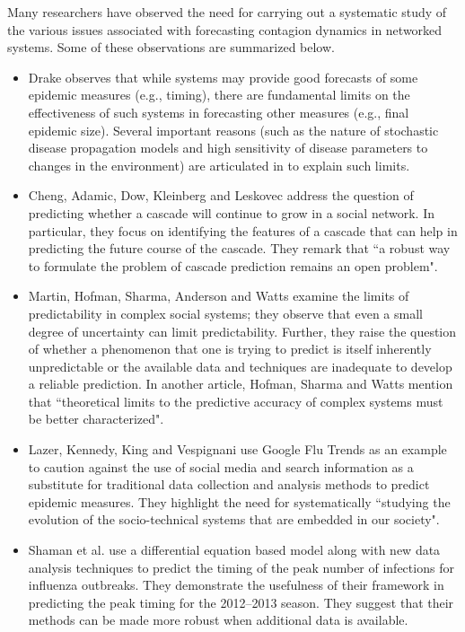 \medskip
Many researchers have observed the need for carrying out
a systematic study of the various issues associated with forecasting 
contagion dynamics in networked systems.
Some of these observations are summarized below.

\begin{itemize}
\item
Drake \cite{Drake-2005, Drake-2006} observes that
while systems may provide good forecasts 
of some epidemic  measures (e.g., timing),
there are fundamental limits on the effectiveness
of such systems in forecasting other measures (e.g., final epidemic size).
Several important reasons (such as the nature of stochastic 
disease propagation models and high sensitivity of disease parameters
to changes in the environment)
are articulated in \cite{Drake-2005,Drake-2006}
to explain such limits. 

\item
Cheng, Adamic, Dow, Kleinberg and Leskovec \cite{Cheng_etal_2016}
address the question of predicting whether a cascade will continue
to grow in a social network.  
In particular, they focus on identifying the features of a cascade
that can help in predicting the future course of the cascade.
They remark that ``a robust way to formulate the problem of cascade
prediction remains an open problem".

\item
Martin, Hofman, Sharma, Anderson and Watts \cite{Martin_etal_2016}
examine the limits of predictability
in complex social systems; they observe that even a small degree of
uncertainty can limit predictability.
Further, they raise the question of whether a phenomenon that
one is trying to predict is itself inherently unpredictable or 
the available data and techniques are inadequate to develop a
reliable prediction.
In another article, Hofman, Sharma and Watts \cite{Hofman-etal-2017}
mention that ``theoretical limits to the predictive accuracy of
complex systems must be better characterized".

\item 
Lazer, Kennedy, King and Vespignani \cite{lazer:science14} use 
Google Flu Trends as an example to caution against the use of social media 
and search information as a substitute for traditional data collection
and analysis methods to predict epidemic measures.
They highlight the need for systematically ``studying the evolution of the
socio-technical systems that are embedded in our society".

\item
Shaman et al. \cite{Shaman-etal-2012,Shaman-etal-2013}
use a differential equation based model along with new
data analysis techniques to predict the timing of the peak number of
infections for influenza outbreaks.
They demonstrate the usefulness of their framework in
predicting the peak timing for the 2012--2013 season.
They suggest that their methods can be made more robust 
when additional data is available. 


\end{itemize}
